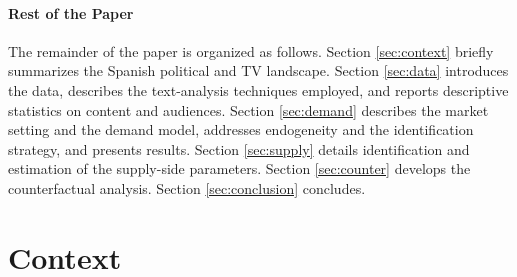 \documentclass[12pt]{article}
\begin{document}

	
	\paragraph{Rest of the Paper}
	
	The remainder of the paper is organized as follows. Section \ref{sec:context} briefly summarizes the Spanish political and TV landscape. Section \ref{sec:data} introduces the data, describes the text-analysis techniques employed, and reports descriptive statistics on content and audiences. Section \ref{sec:demand} describes the market setting and the demand model, addresses endogeneity and the identification strategy, and presents results. Section \ref{sec:supply} details identification and estimation of the supply-side parameters. Section \ref{sec:counter} develops the counterfactual analysis. Section \ref{sec:conclusion} concludes.
	
	
	
	\section{Context}
	
\end{document}
